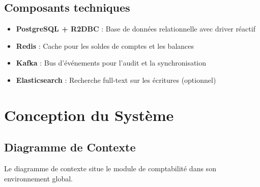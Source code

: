 \documentclass[12pt]{report}
\begin{document}
\section{Composants techniques}
\begin{itemize}
    \item \textbf{PostgreSQL + R2DBC} : Base de données relationnelle avec driver réactif
    \item \textbf{Redis} : Cache pour les soldes de comptes et les balances
    \item \textbf{Kafka} : Bus d'événements pour l'audit et la synchronisation
    \item \textbf{Elasticsearch} : Recherche full-text sur les écritures (optionnel)
\end{itemize}

\chapter{Conception du Système}

\section{Diagramme de Contexte}
Le diagramme de contexte situe le module de comptabilité dans son environnement global.
\end{document}
